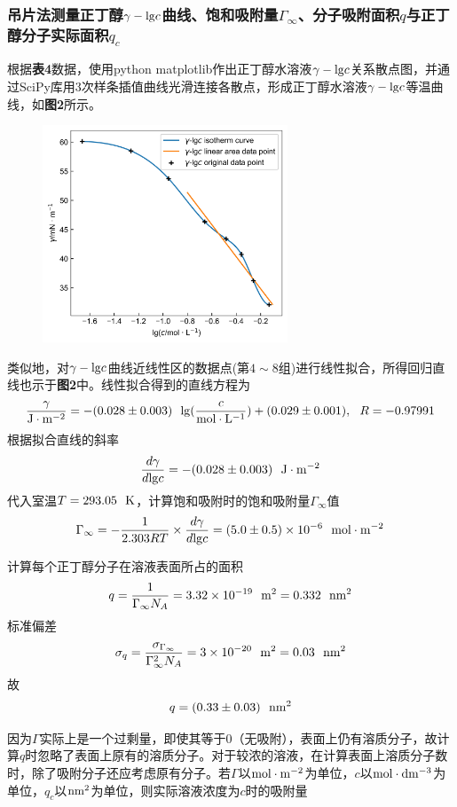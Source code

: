 \documentclass[12pt]{article}
\begin{document}
\subsubsection{吊片法测量正丁醇$\gamma-{\rm lg}c$曲线、饱和吸附量$\Gamma_{\infty}$、分子吸附面积$q$与正丁醇分子实际面积$q_{c}$}
根据\textbf{表4}数据，使用python matplotlib作出正丁醇水溶液$\gamma-{\rm lg}c$关系散点图，并通过SciPy库用3次样条插值曲线光滑连接各散点，形成正丁醇水溶液$\gamma-{\rm lg}c$等温曲线，如\textbf{图2}所示。
\begin{figure}[h]
	\centering
	\includegraphics[width=0.65\textwidth]{2.jpg}
\end{figure}
\par
类似地，对$\gamma-{\rm lg}c$曲线近线性区的数据点(第$4\sim 8$组)进行线性拟合，所得回归直线也示于\textbf{图2}中。线性拟合得到的直线方程为
$$
\frac{\gamma}{{\rm J\cdot m^{-2}}}=-(0.028 \pm 0.003 )\ \ {\rm lg}(\frac{c}{{\rm mol\cdot L^{-1}}})+(0.029\pm 0.001),\ \ R=-0.97991
$$
根据拟合直线的斜率
$$
\frac{d\gamma}{d{\rm lg}c}=-(0.028\pm 0.003)\ \ {\rm J\cdot m^{-2}}
$$
代入室温$T=293.05\ \ {\rm K}$，计算饱和吸附时的饱和吸附量$\Gamma_{\infty}$值
$$
\Gamma_{\infty}=-\frac{1}{2.303RT}\times\frac{d\gamma}{d{\rm lg}c}=(5.0\pm 0.5)\times10^{-6}\ \ {\rm mol\cdot m^{-2}}
$$
\par 
计算每个正丁醇分子在溶液表面所占的面积
$$
q=\frac{1}{\Gamma_{\infty}N_{A}}=3.32\times10^{-19}\ \ {\rm m^2}=0.332\ \ {\rm nm^{2}}
$$
标准偏差
$$
\sigma_{q}=\frac{\sigma_{\Gamma_{\infty}}}{\Gamma^{2}_{\infty} N_{A}}=3\times10^{-20}\ \ {\rm m^{2}}=0.03\ \ {\rm nm^{2}}
$$
故
$$
q=(0.33\pm 0.03)\ \ {\rm nm^{2}}
$$
\par 
因为$\Gamma$实际上是一个过剩量，即使其等于0（无吸附），表面上仍有溶质分子，故计算$q$时忽略了表面上原有的溶质分子。对于较浓的溶液，在计算表面上溶质分子数时，除了吸附分子还应考虑原有分子。若$\Gamma$以$\rm mol\cdot m^{-2}$为单位，$c$以$\rm mol\cdot dm^{-3}$为单位，$q_{c}$以$\rm nm^{2}$为单位，则实际溶液浓度为$c$时的吸附量
\end{document}
